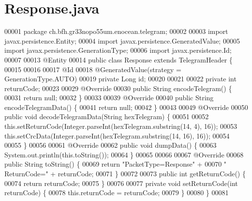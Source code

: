 \section{Response.\+java}
\label{Response_8java_source}

\begin{DoxyCode}
00001 \textcolor{keyword}{package }ch.bfh.gr33nopo55um.enocean.telegram;
00002 
00003 \textcolor{keyword}{import} javax.persistence.Entity;
00004 \textcolor{keyword}{import} javax.persistence.GeneratedValue;
00005 \textcolor{keyword}{import} javax.persistence.GenerationType;
00006 \textcolor{keyword}{import} javax.persistence.Id;
00007 
00013 @Entity
00014 \textcolor{keyword}{public} \textcolor{keyword}{class }Response \textcolor{keyword}{extends} TelegramHeader \{
00015 
00016 
00017     @Id
00018     @GeneratedValue(strategy = GenerationType.AUTO)
00019     private Long \textcolor{keywordtype}{id};
00020 
00021 
00022     private \textcolor{keywordtype}{int} returnCode;
00023 
00029     @Override
00030     public String encodeTelegram() \{
00031         \textcolor{keywordflow}{return} null;
00032     \}
00033 
00039     @Override
00040     \textcolor{keyword}{public} String encodeTelegramData() \{
00041         \textcolor{keywordflow}{return} null;
00042     \}
00043 
00049     @Override
00050     \textcolor{keyword}{public} \textcolor{keywordtype}{void} decodeTelegramData(String hexTelegram) \{
00051 
00052         this.setReturnCode(Integer.parseInt(hexTelegram.substring(14, 4), 16));
00053         this.setCrcData(Integer.parseInt(hexTelegram.substring(14, 16), 16));
00054 
00055     \}
00056 
00061     @Override
00062     \textcolor{keyword}{public} \textcolor{keywordtype}{void} dumpData() \{
00063         System.out.println(this.toString());
00064     \}
00065 
00066 
00067     @Override
00068     \textcolor{keyword}{public} String toString() \{
00069         \textcolor{keywordflow}{return} \textcolor{stringliteral}{"PacketType=Response"} +
00070                 \textcolor{stringliteral}{" ReturnCode="} + returnCode;
00071     \}
00072 
00073     \textcolor{keyword}{public} \textcolor{keywordtype}{int} getReturnCode() \{
00074         \textcolor{keywordflow}{return} returnCode;
00075     \}
00076 
00077     \textcolor{keyword}{private} \textcolor{keywordtype}{void} setReturnCode(\textcolor{keywordtype}{int} returnCode) \{
00078         this.returnCode = returnCode;
00079     \}
00080 \}
00081 
\end{DoxyCode}
